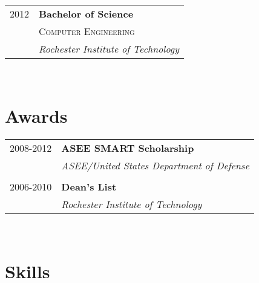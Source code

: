 \documentclass[10pt]{article} %
\begin{document}
{\begin{minipage}[t]{0.44\textwidth}
\begin{tabular}{rl}

2012 & \textbf{Bachelor of Science} \\ 
& \textsc{Computer Engineering} \\ 
& \textit{Rochester Institute of Technology}\\
	

\end{tabular}\\[10pt]


\section{Awards} 

\begin{tabular}{rl}
2008-2012 & \textbf{ASEE SMART Scholarship}\\
& \textit{ASEE/United States Department of Defense}\\ \\


2006-2010 & \textbf{Dean's List}\\
& \textit{Rochester Institute of Technology}
\end{tabular}\\[10pt]


\section{Skills} 


\end{minipage}}
\end{document}
